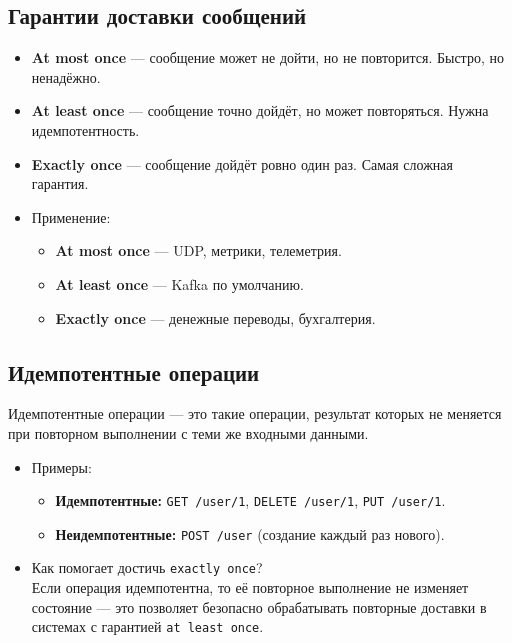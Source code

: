 \documentclass[a4paper,14pt]{article}
\begin{document}
\subsection{Гарантии доставки сообщений}

\begin{itemize}
\item \textbf{At most once} — сообщение может не дойти, но не повторится. Быстро, но ненадёжно.
\item \textbf{At least once} — сообщение точно дойдёт, но может повторяться. Нужна идемпотентность.
\item \textbf{Exactly once} — сообщение дойдёт ровно один раз. Самая сложная гарантия.

\item Применение:
\begin{itemize}
  \item \textbf{At most once} — UDP, метрики, телеметрия.
  \item \textbf{At least once} — Kafka по умолчанию.
  \item \textbf{Exactly once} — денежные переводы, бухгалтерия.
\end{itemize}
\end{itemize}

\subsection{Идемпотентные операции}
Идемпотентные операции — это такие операции, результат которых не меняется при повторном выполнении с теми же входными данными.
\begin{itemize}
\item Примеры:
\begin{itemize}
  \item \textbf{Идемпотентные:} \texttt{GET /user/1}, \texttt{DELETE /user/1}, \texttt{PUT /user/1}.
  \item \textbf{Неидемпотентные:} \texttt{POST /user} (создание каждый раз нового).
\end{itemize}

\item Как помогает достичь \texttt{exactly once}? \\
Если операция идемпотентна, то её повторное выполнение не изменяет состояние — это позволяет безопасно обрабатывать повторные доставки в системах с гарантией \texttt{at least once}.
\end{itemize}
\end{document}
